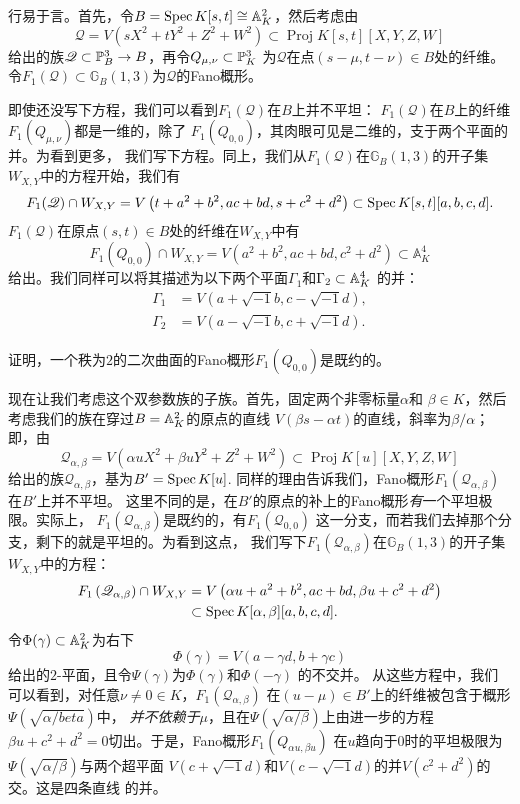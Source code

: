 
行易于言。首先，令$B=\spec K[s,t]\cong \A_K^2$，然后考虑由
\[
	\mathscr{Q}=V\left(s X^{2}+t Y^{2}+Z^{2}+W^{2}\right) \subset \operatorname{Proj} K[s, t][X, Y, Z, W]
\]
给出的族$\mathscr Q\subset \P_B^3\to B$，再令$Q_{\mu,\nu}\subset \P_K^3$
为$\mathscr Q$在点$(s-\mu,t-\nu)\in B$处的纤维。令$F_1(\mathscr Q)\subset 
\mathbb G_B(1,3)$为$\mathscr Q$的Fano概形。

即使还没写下方程，我们可以看到$F_1(\mathscr Q)$在$B$上并不平坦：
$F_1(\mathscr Q)$在$B$上的纤维$F_1(Q_{\mu,\nu})$都是一维的，除了
$F_1(Q_{0,0})$，其肉眼可见是二维的，支于两个平面的并。为看到更多，
我们写下方程。同上，我们从$F_1(\mathscr Q)$在$\mathbb G_B(1,3)$的开子集
$W_{X,Y}$中的方程开始，我们有
\[
	F_{1}(\mathscr{Q}) \cap W_{X, Y}=V\left(t+a^{2}+b^{2}, a c+b d, s+c^{2}+d^{2}\right) \subset \spec K[s, t][a, b, c, d].
\]
$F_1(\mathscr Q)$在原点$(s,t)\in B$处的纤维在$W_{X,Y}$中有
\[
	F_{1}\left(Q_{0,0}\right) \cap W_{X, Y}=V\left(a^{2}+b^{2}, a c+b d, c^{2}+d^{2}\right) \subset \mathbb{A}_{K}^{4}
\]
给出。我们同样可以将其描述为以下两个平面$\Gamma_1$和$\Gamma_2\subset \A_K^4$
的并：
\begin{align*}
	\Gamma_{1}&=V(a+\sqrt{-1} b, c-\sqrt{-1} d),\\
	\Gamma_{2}&=V(a-\sqrt{-1} b, c+\sqrt{-1} d).
\end{align*}

\begin{exe}\label{exe:6.68}
	证明，一个秩为$2$的二次曲面的Fano概形$F_1(Q_{0,0})$是既约的。
\end{exe}

现在让我们考虑这个双参数族的子族。首先，固定两个非零标量$\alpha$和
$\beta\in K$，然后考虑我们的族在穿过$B=\A_K^2$的原点的直线
$V(\beta s-\alpha t)$的直线，斜率为$\beta/\alpha$；即，由
\[
	\mathscr{Q}_{\alpha, \beta}=V\left(\alpha u X^{2}+\beta u Y^{2}+Z^{2}+W^{2}\right) \subset \operatorname{Proj} K[u][X, Y, Z, W]
\]
给出的族$\mathscr Q_{\alpha,\beta}$，基为$B'=\spec K[u]$.
同样的理由告诉我们，Fano概形$F_1(\mathscr Q_{\alpha,\beta})$在$B'$上并不平坦。
这里不同的是，在$B'$的原点的补上的Fano概形\emph{有}一个平坦极限。实际上，
$F_1(\mathscr Q_{\alpha,\beta})$是既约的，有$F_1(\mathscr Q_{0,0})$
这一分支，而若我们去掉那个分支，剩下的就是平坦的。为看到这点，
我们写下$F_1(\mathscr Q_{\alpha,\beta})$在$\mathbb G_B(1,3)$的开子集
$W_{X,Y}$中的方程：
\[
\begin{aligned} F_{1}\left(\mathscr{Q}_{\alpha, \beta}\right) \cap W_{X, Y} &=V\left(\alpha u+a^{2}+b^{2}, a c+b d, \beta u+c^{2}+d^{2}\right) \\ & \subset \spec K[\alpha, \beta][a, b, c, d]. \end{aligned}
\]
令$\Phi(\gamma)\subset \A_K^2$为右下
\[
	\Phi(\gamma)=V(a-\gamma d, b+\gamma c)
\]
给出的$2$-平面，且令$\Psi(\gamma)$为$\Phi(\gamma)$和$\Phi(-\gamma)$
的不交并。%
%
%
从这些方程中，我们可以看到，对任意$\nu\neq 0\in K$，$F_1(\mathscr Q_{\alpha,\beta})$
在$(u-\mu)\in B'$上的纤维被包含于概形$\Psi(\sqrt{\alpha/beta})$中，
\emph{并不依赖于$\mu$}，且在$\Psi(\sqrt{\alpha/\beta})$上由进一步的方程
$\beta u+c^2+d^2=0$切出。于是，Fano概形$F_1(Q_{\alpha u,\beta u})$
在$u$趋向于$0$时的平坦极限为$\Psi(\sqrt{\alpha/\beta})$与两个超平面
$V(c+\sqrt{-1}d)$和$V(c-\sqrt{-1}d)$的并$V(c^2+d^2)$的交。这是四条直线
的并。


